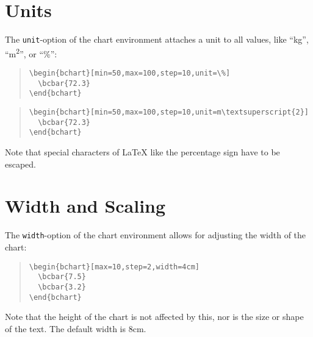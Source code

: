 \documentclass{article}
\begin{document}
\section{Units}

The \texttt{unit}-option of the chart environment attaches a unit to all values, like ``kg'', ``m\textsuperscript{2}'', or ``\%'':
\begin{quote}\small
\begin{verbatim}
\begin{bchart}[min=50,max=100,step=10,unit=\%]
  \bcbar{72.3}
\end{bchart}
\end{verbatim}
\end{quote}
\begin{quote}
\begin{bchart}[min=50,max=100,step=10,unit=\%]
\end{bchart}
\end{quote}
\begin{quote}\small
\begin{verbatim}
\begin{bchart}[min=50,max=100,step=10,unit=m\textsuperscript{2}]
  \bcbar{72.3}
\end{bchart}
\end{verbatim}
\end{quote}
\begin{quote}
\begin{bchart}[min=50,max=100,step=10,unit=m\textsuperscript{2}]
\end{bchart}
\end{quote}
Note that special characters of {\LaTeX} like the percentage sign have to be escaped.


\section{Width and Scaling}

The \texttt{width}-option of the chart environment allows for adjusting the width of the chart:
\begin{quote}\small
\begin{verbatim}
\begin{bchart}[max=10,step=2,width=4cm]
  \bcbar{7.5}
  \bcbar{3.2}
\end{bchart}
\end{verbatim}
\end{quote}
\begin{quote}
\begin{bchart}[max=10,step=2,width=4cm]
\end{bchart}
\end{quote}
Note that the height of the chart is not affected by this, nor is the size or shape of the text. The default width is 8cm.
\end{document}
